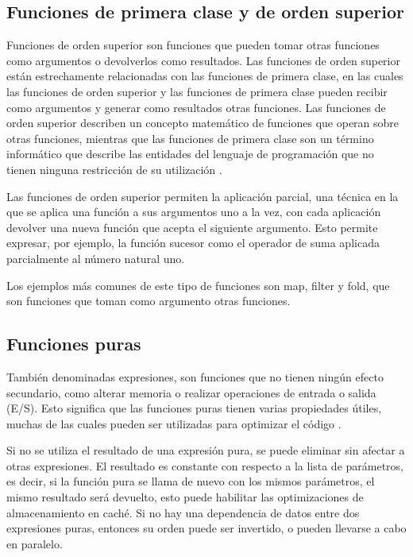 
\subsection{Funciones de primera clase y de orden superior}

Funciones de orden superior son funciones que pueden tomar otras funciones como argumentos o devolverlos como resultados. Las funciones de orden superior están estrechamente relacionadas con las funciones de primera clase, en las cuales las funciones de orden superior y las funciones de primera clase pueden recibir como argumentos y generar como resultados otras funciones. Las funciones de orden superior describen un concepto matemático de funciones que operan sobre otras funciones, mientras que las funciones de primera clase son un término informático que describe las entidades del lenguaje de programación que no tienen ninguna restricción de su utilización  \cite{wiki:FunctionalProgramming}.

Las funciones de orden superior permiten la aplicación parcial, una técnica en la que se aplica una función a sus argumentos uno a la vez, con cada aplicación devolver una nueva función que acepta el siguiente argumento. Esto permite expresar, por ejemplo, la función sucesor como el operador de suma aplicada parcialmente al número natural uno.

Los ejemplos más comunes de este tipo de funciones son map, filter y fold, que son funciones que toman como argumento otras funciones.

\subsection{Funciones puras}

También denominadas expresiones, son funciones que no tienen ningún efecto secundario, como alterar memoria o realizar operaciones de entrada o salida (E/S). Esto significa que las funciones puras tienen varias propiedades útiles, muchas de las cuales pueden ser utilizadas para optimizar el código \cite{wiki:FunctionalProgramming}.

Si no se utiliza el resultado de una expresión pura, se puede eliminar sin afectar a otras expresiones. El resultado es constante con respecto a la lista de parámetros, es decir, si la función pura se llama de nuevo con los mismos parámetros, el mismo resultado será devuelto, esto puede habilitar las optimizaciones de almacenamiento en caché. Si no hay una dependencia de datos entre dos expresiones puras, entonces su orden puede ser invertido, o pueden llevarse a cabo en paralelo.

